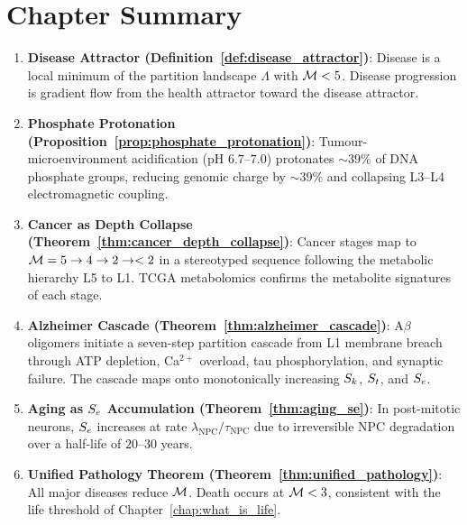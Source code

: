 \section*{Chapter Summary}
\label{sec:ch22_summary}

\begin{chapterbox}[title=Chapter 22 --- Key Results Established]
\begin{enumerate}[label=\textbf{\arabic*.}]
  \item \textbf{Disease Attractor (Definition~\ref{def:disease_attractor})}:
        Disease is a local minimum of the partition landscape $\Lambda$ with
        $\mathcal{M} < 5$. Disease progression is gradient flow from the health
        attractor toward the disease attractor.

  \item \textbf{Phosphate Protonation (Proposition~\ref{prop:phosphate_protonation})}:
        Tumour-microenvironment acidification (pH $6.7$--$7.0$) protonates
        $\sim 39\%$ of DNA phosphate groups, reducing genomic charge by
        $\sim 39\%$ and collapsing L3--L4 electromagnetic coupling.

  \item \textbf{Cancer as Depth Collapse (Theorem~\ref{thm:cancer_depth_collapse})}:
        Cancer stages map to $\mathcal{M} = 5 \to 4 \to 2 \to <2$ in a stereotyped
        sequence following the metabolic hierarchy L5 to L1.
        TCGA metabolomics confirms the metabolite signatures of each stage.

  \item \textbf{Alzheimer Cascade (Theorem~\ref{thm:alzheimer_cascade})}:
        A$\beta$ oligomers initiate a seven-step partition cascade from L1
        membrane breach through ATP depletion, Ca$^{2+}$ overload, tau
        phosphorylation, and synaptic failure. The cascade maps onto
        monotonically increasing $S_k$, $S_t$, and $S_e$.

  \item \textbf{Aging as $S_e$ Accumulation (Theorem~\ref{thm:aging_se})}:
        In post-mitotic neurons, $S_e$ increases at rate $\lambda_{\mathrm{NPC}}/\tau_{\mathrm{NPC}}$
        due to irreversible NPC degradation over a half-life of $20$--$30$ years.

  \item \textbf{Unified Pathology Theorem (Theorem~\ref{thm:unified_pathology})}:
        All major diseases reduce $\mathcal{M}$. Death occurs at $\mathcal{M} < 3$,
        consistent with the life threshold of Chapter~\ref{chap:what_is_life}.


\end{enumerate}
\end{chapterbox}
